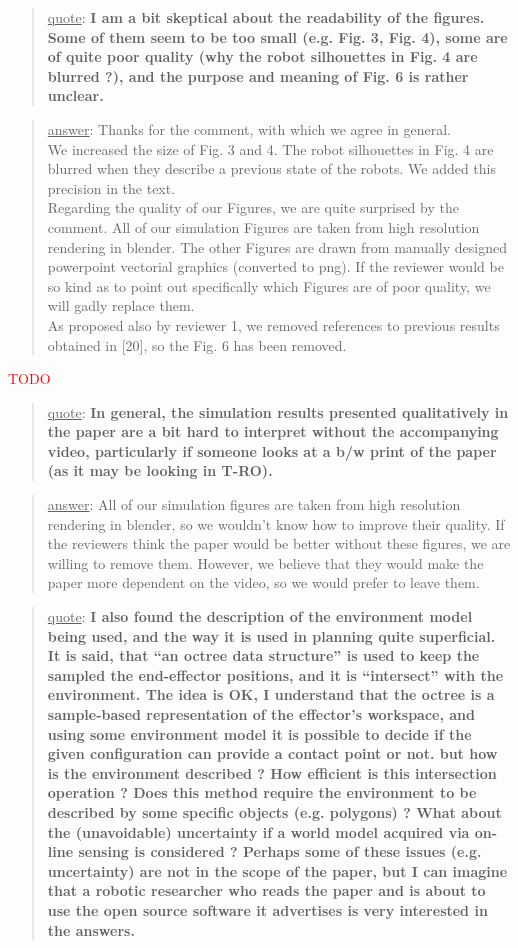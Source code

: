\documentclass[a4paper]{article}
\newcommand{\ndone}[0]{\textcolor{red}{TODO}}
\newcommand\quot[1]{\begin{quote} \underline{quote}: \textbf{#1}\end{quote}}
\newcommand\as[1]{\begin{quote} \underline{answer}: {#1}\end{quote} }
\begin{document}
\quot{I am a bit skeptical about the readability of the figures. Some of them seem to be too small (e.g. Fig. 3, Fig. 4), some are of quite poor quality (why the robot silhouettes in Fig. 4 are blurred ?), and the purpose and meaning of Fig. 6 is rather unclear.}
\as{Thanks for the comment, with which we agree in general.  \\We increased the size of Fig. 3 and 4. The robot silhouettes in Fig. 4 are blurred when they describe a previous state of the robots. We added this precision in the text. \\Regarding the quality of our Figures, we are quite surprised by the comment. All of our simulation Figures are taken from high resolution rendering in blender. The other Figures are drawn from manually designed powerpoint vectorial graphics (converted to png). If the reviewer would be so kind as to point out specifically which Figures are of poor quality, we will gadly replace them.\\ As proposed also by reviewer 1, we removed references to previous results obtained in [20], so the Fig. 6 has been removed.}\ndone

\quot{In general, the simulation results presented qualitatively in the paper are a bit hard to interpret without the accompanying video, particularly if someone looks at a b/w print of the paper (as it may be looking in T-RO).}
\as{All of our simulation figures are taken from high resolution rendering in blender, so we wouldn't know how to improve their quality. If the reviewers think the paper would be better without these figures, we are willing to remove them. However, we believe that they would make the paper more dependent on the video, so we would prefer to leave them.}


\quot{ I also found the description of the environment model being
used,
and the way it is used in planning quite superficial. It is said, that
``an octree data structure'' is used to keep the sampled the
end-effector positions, and it is ``intersect'' with the environment.
The idea is OK, I understand that the octree is a sample-based
representation of the effector's workspace, and using some environment
model it is possible to decide if the given configuration can provide a
contact point or not. but how is the environment described ? How
efficient is this intersection operation ? Does this method require the
environment to be described by some specific objects (e.g. polygons) ?
What about the (unavoidable) uncertainty if a world model acquired via
on-line sensing is considered ? Perhaps some of these issues (e.g.
uncertainty) are not in the scope of the paper, but I can imagine that
a robotic researcher who reads the paper and is about to use the open
source software it advertises is very interested in the answers.}
\end{document}

